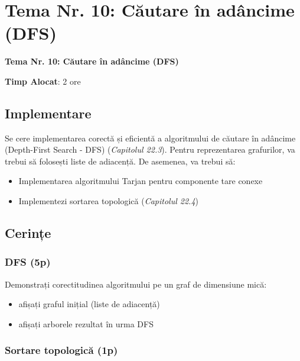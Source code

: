 \documentclass[../ro-fa-lab.tex]{subfiles}
\begin{document}
\section{\texorpdfstring{\textbf{Tema Nr. 10: Căutare în adâncime (DFS)}}{Tema Nr. 10: Căutare în adâncime (DFS)}}\label{assign9}

\textbf{Tema Nr. 10: Căutare în adâncime (DFS)}

\textbf{Timp Alocat}: 2 ore

\subsection{Implementare}\label{implementare}

Se cere implementarea corectă și eficientă a algoritmului de căutare în
adâncime (Depth-First Search - DFS) (\emph{Capitolul
22.3\citep{cormen}}). Pentru reprezentarea grafurilor, va trebui să
folosești liste de adiacență. De asemenea, va trebui să:

\begin{itemize}
\item
  Implementarea algoritmului Tarjan pentru componente tare conexe
\item
  Implementezi sortarea topologică (\emph{Capitolul
  22.4}\emph{\citep{cormen}})
\end{itemize}

\subsection{Cerințe}\label{cerinux21be}

\subsubsection{DFS (5p)}\label{dfs-5p}

Demonstrați corectitudinea algoritmului pe un graf de dimensiune mică:

\begin{itemize}
\item
  afișați graful inițial (liste de adiacență)
\item
  afișați arborele rezultat în urma DFS
\end{itemize}

\subsubsection{Sortare topologică (1p)}\label{sortare-topologicux103-1p}
\end{document}
